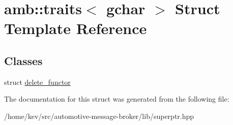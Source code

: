 \hypertarget{structamb_1_1traits_3_01gchar_01_4}{\section{amb\+:\+:traits$<$ gchar $>$ Struct Template Reference}
\label{structamb_1_1traits_3_01gchar_01_4}
}
\subsection*{Classes}
\begin{DoxyCompactItemize}
\item 
struct \hyperlink{structamb_1_1traits_3_01gchar_01_4_1_1delete__functor}{delete\+\_\+functor}
\end{DoxyCompactItemize}


The documentation for this struct was generated from the following file\+:\begin{DoxyCompactItemize}
\item 
/home/kev/src/automotive-\/message-\/broker/lib/superptr.\+hpp\end{DoxyCompactItemize}
